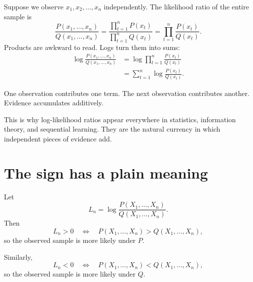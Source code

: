 \documentclass[en,nofont,11pt]{elegantbook}
\begin{document}
Suppose we observe $x_1,x_2,\ldots,x_n$ independently. The likelihood ratio of the entire sample is
\[
\frac{P(x_1,\ldots,x_n)}{Q(x_1,\ldots,x_n)}
=
\frac{\prod_{t=1}^{n}P(x_t)}{\prod_{t=1}^{n}Q(x_t)}
=
\prod_{t=1}^{n}\frac{P(x_t)}{Q(x_t)}.
\]
Products are awkward to read. Logs turn them into sums:
\begin{align*}
\log\frac{P(x_1,\ldots,x_n)}{Q(x_1,\ldots,x_n)}
&=
\log\prod_{t=1}^{n}\frac{P(x_t)}{Q(x_t)}\\
&=
\sum_{t=1}^{n}\log\frac{P(x_t)}{Q(x_t)}.
\end{align*}

One observation contributes one term. The next observation contributes another. Evidence accumulates additively.

\begin{center}
\end{center}

This is why log-likelihood ratios appear everywhere in statistics, information theory, and sequential learning. They are the natural currency in which independent pieces of evidence add.

\section{The sign has a plain meaning}

Let
\[
L_n
=
\log\frac{P(X_1,\ldots,X_n)}{Q(X_1,\ldots,X_n)}.
\]
Then
\[
L_n>0
\quad\Longleftrightarrow\quad
P(X_1,\ldots,X_n)>Q(X_1,\ldots,X_n),
\]
so the observed sample is more likely under $P$.

Similarly,
\[
L_n<0
\quad\Longleftrightarrow\quad
P(X_1,\ldots,X_n)<Q(X_1,\ldots,X_n),
\]
so the observed sample is more likely under $Q$.
\end{document}

